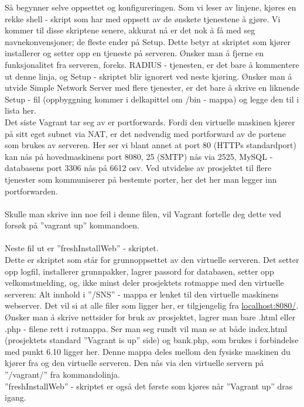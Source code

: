 \documentclass{article}
\begin{document}
Så begynner selve oppsettet og konfigureringen. Som vi leser av linjene, kjøres en rekke shell - skript som har med oppsett av de ønskete tjenestene å gjøre. Vi kommer til disse skriptene senere, akkurat nå er det nok å få med seg navnekonvensjoner; de fleste ender på Setup. Dette betyr at skriptet som kjører installerer og setter opp en tjeneste på serveren. Ønsker man å fjerne en funksjonalitet fra serveren, foreks. RADIUS - tjenesten, er det bare å kommentere ut denne linja, og Setup - skriptet blir ignorert ved neste kjøring. Ønsker man å utvide Simple Network Server med flere tjenester, er det bare å skrive en liknende Setup - fil (oppbyggning kommer i delkapittel om /bin - mappa) og legge den til i lista her. \\
Det siste Vagrant tar seg av er portforwards. Fordi den virtuelle maskinen kjører på sitt eget subnet via NAT, er det nødvendig med portforward av de portene som brukes av serveren. Her ser vi blant annet at port 80 (HTTPs standardport) kan nås på hovedmaskinens port 8080, 25 (SMTP) nås via 2525, MySQL - databasens port 3306 nås på 6612 osv. Ved utvidelse av prosjektet til flere tjenester som kommuniserer på bestemte porter, her det her man legger inn portforwarden. \\ \\
Skulle man skrive inn noe feil i denne filen, vil Vagrant fortelle deg dette ved forsøk på ''vagrant up'' kommandoen. 
\\ \\
Neste fil ut er ''freshInstallWeb'' - skriptet. \\
Dette er skriptet som står for grunnoppsettet av den virtuelle serveren. Det setter opp logfil, installerer grunnpakker, lagrer passord for databasen, setter opp velkomstmelding, og, ikke minst deler prosjektets rotmappe med den virtuelle serveren: Alt innhold i ''/SNS'' - mappa er lenket til den virtuelle maskinens webserver. Det vil si at alle filer som ligger her, er tilgjengelig fra \url{localhost:8080/}. Ønsker man å skrive nettsider for bruk av prosjektet, lagrer man bare .html eller .php - filene rett i rotmappa. Ser man seg rundt vil man se at både index.html (prosjektets standard ''Vagrant is up'' side) og bank.php, som brukes i forbindelse med punkt 6.10 ligger her. Denne mappa deles mellom den fysiske maskinen du kjører fra og den virtuelle serveren. Den nås via den virtuelle servern på ''/vagrant/'' fra kommandolinja. \\
''freshInstallWeb'' - skriptet er også det første som kjøres når ''Vagrant up'' dras igang.
\end{document}
